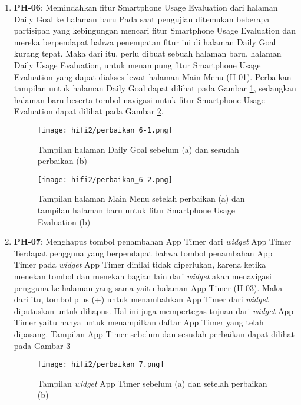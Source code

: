 \begin{enumerate}
  \item \textbf{PH-06}: Memindahkan fitur Smartphone Usage Evaluation dari halaman Daily Goal ke halaman baru
  \subitem Pada saat pengujian ditemukan beberapa partisipan yang kebingungan mencari fitur Smartphone Usage Evaluation dan mereka berpendapat bahwa penempatan fitur ini di halaman Daily Goal kurang tepat. Maka dari itu, perlu dibuat sebuah halaman baru, halaman Daily Usage Evaluation, untuk menampung fitur Smartphone Usage Evaluation yang dapat diakses lewat halaman Main Menu (H-01). Perbaikan tampilan untuk halaman Daily Goal dapat dilihat pada Gambar \ref{img:perbaikan_6-1}, sedangkan halaman baru beserta tombol navigasi untuk fitur Smartphone Usage Evaluation dapat dilihat pada Gambar \ref{img:perbaikan_6-2}.
  
  \begin{figure}[h]
    \centering
    \texttt{[image: hifi2/perbaikan\_6-1.png]}
    \caption{Tampilan halaman Daily Goal sebelum (a) dan sesudah perbaikan (b)}
    \label{img:perbaikan_6-1}
  \end{figure}
  \FloatBarrier
  
  \begin{figure}[h]
    \centering
    \texttt{[image: hifi2/perbaikan\_6-2.png]}
    \caption{Tampilan halaman Main Menu setelah perbaikan (a) dan tampilan halaman baru untuk fitur Smartphone Usage Evaluation (b)}
    \label{img:perbaikan_6-2}
  \end{figure}
  \FloatBarrier

  \item \textbf{PH-07}: Menghapus tombol penambahan App Timer dari \textit{widget} App Timer
  \subitem Terdapat pengguna yang berpendapat bahwa tombol penambahan App Timer pada \textit{widget} App Timer dinilai tidak diperlukan, karena ketika menekan tombol dan menekan bagian lain dari \textit{widget} akan menavigasi pengguna ke halaman yang sama yaitu halaman App Timer (H-03). Maka dari itu, tombol plus (+) untuk menambahkan App Timer dari \textit{widget} diputuskan untuk dihapus. Hal ini juga mempertegas tujuan dari \textit{widget} App Timer yaitu hanya untuk menampilkan daftar App Timer yang telah dipasang. Tampilan App Timer sebelum dan sesudah perbaikan dapat dilihat pada Gambar \ref{img:perbaikan_7}    

  \begin{figure}[h]
    \centering
    \texttt{[image: hifi2/perbaikan\_7.png]}
    \caption{Tampilan \textit{widget} App Timer sebelum (a) dan setelah perbaikan (b)}
    \label{img:perbaikan_7}
  \end{figure}
  \FloatBarrier
  
\end{enumerate}
